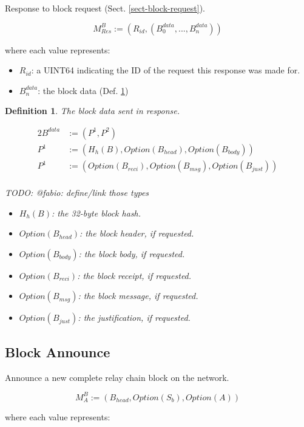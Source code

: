 \documentclass{book}
\newtheorem{definition}{Definition}
\newcommand{\todo}[1]{}
\renewcommand{\todo}[1]{{\color{red} TODO: {#1}}}
\begin{document}
Response to block request (Sect. \ref{sect-block-request}).

\[
    M^B_{Res} := (R_{id}, (B^{data}_0, ..., B^{data}_n))
\]

where each value represents:

\begin{itemize}
    \item $R_{id}$: a UINT64 indicating the ID of the request this response was
    made for.
    \item $B^{data}_n$: the block data (Def. \ref{defn-block-data})
\end{itemize}

\begin{definition}
    \label{defn-block-data}
    The block data sent in response.

    \begin{alignat*}{2}
        B^{data} &:= (P^1, P^2) \\
        P^1 &:= (H_h(B), Option(B_{head}), Option(B_{body})) \\
        P^1 &:= (Option(B_{reci}), Option(B_{msg}), Option(B_{just}))\\
    \end{alignat*}

    \todo{@fabio: define/link those types}
    \begin{itemize}
        \item $H_h(B)$: the 32-byte block hash.
        \item $Option(B_{head})$: the block header, if requested.
        \item $Option(B_{body})$: the block body, if requested.
        \item $Option(B_{reci})$: the block receipt, if requested.
        \item $Option(B_{msg})$: the block message, if requested.
        \item $Option(B_{just})$: the justification, if requested.
    \end{itemize}
\end{definition}

\subsection{Block Announce}

Announce a new complete relay chain block on the network.

\[
    M^B_A := (B_{head}, Option(S_b), Option(A))
\]

where each value represents:
\end{document}
